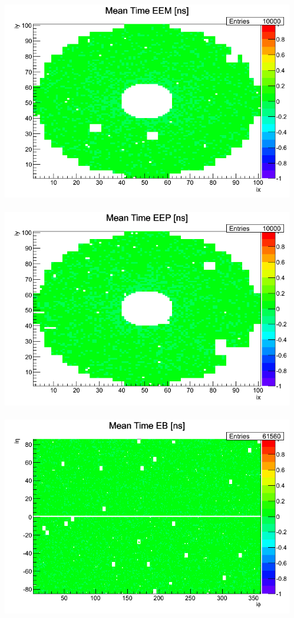\documentclass{beamer}
\begin{document}
\begin{frame}
\begin{minipage}[b]{0.83\paperwidth}
\begin{columns}
\begin{column}{0.50\linewidth}
\begin{tcolorbox}[colback=UNL@Cream!5,colframe=UNL@Cream!70,title=\textcolor{UMN@Maroon}{\textbf{Before Calibration}}]
     \end{tcolorbox}
     \end{column}
     \begin{column}{0.50\linewidth}
       \begin{tcolorbox}[colback=UNL@Cream!5,colframe=UNL@Cream!70,title=\textcolor{UMN@Maroon}{\textbf{After Calibration}}] 
      \mbox{            
            \includegraphics[height=0.45\textwidth, width=0.53\linewidth]{THESISPLOTS/calibDiffMapEEM_AFter_CALIB.png}
            \includegraphics[height=0.45\textwidth, width=0.53\linewidth]{THESISPLOTS/calibDiffMapEEP_After_CALIB.png} }
            \includegraphics[height=0.45\textwidth, width=0.93\linewidth]{THESISPLOTS/calibDiffMapEB_After_Calibration.png}
      
     \end{tcolorbox}     
    \end{column}
   \end{columns} 
 \end{minipage}
\end{frame}
   
\end{document}
